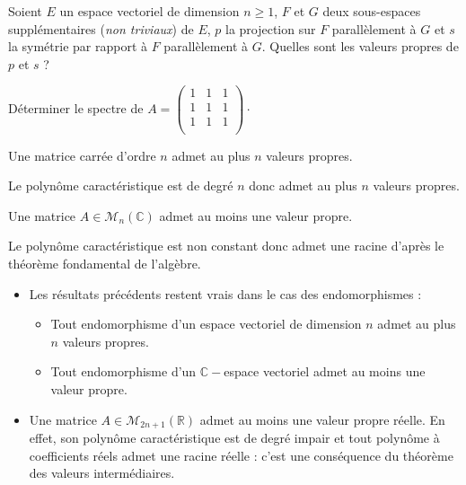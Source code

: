 \documentclass[french,11pt,twoside]{VcCours}
\begin{document}
\newpage
\begin{Exemple}{} Soient $E$ un espace vectoriel de dimension $n \geq 1$, $F$ et $G$ deux sous-espaces supplémentaires (\emph{non triviaux}) de $E$, $p$ la projection sur $F$ parallèlement à $G$ et $s$ la symétrie par rapport à $F$ parallèlement à $G$. Quelles sont les valeurs propres de $p$ et $s$ ?

\vspace*{4cm}
\end{Exemple} 

\begin{ApplicationDirecte}{} Déterminer le spectre de $A = \begin{pmatrix}
1 & 1 & 1 \\
1 & 1 & 1 \\
1 & 1 & 1 \\
\end{pmatrix}\cdot$
\end{ApplicationDirecte}

\begin{Corollaire}{} Une matrice carrée d'ordre $n$ admet au plus $n$ valeurs propres.
\end{Corollaire}

\begin{Demonstration}{} Le polynôme caractéristique est de degré $n$ donc admet au plus $n$ valeurs propres.
\end{Demonstration}

\begin{Corollaire}{} Une matrice $A \in \mathcal{M}_n(\mathbb{C})$ admet au moins une valeur propre.
\end{Corollaire}

\begin{Demonstration}{} Le polynôme caractéristique est non constant donc admet une racine d'après le théorème fondamental de l'algèbre.
\end{Demonstration}


\begin{Remarques}{}
\begin{itemize}
\item Les résultats précédents restent vrais dans le cas des endomorphismes : 
\begin{itemize}
\item Tout endomorphisme d'un espace vectoriel de dimension $n$ admet au plus $n$ valeurs propres.
\item Tout endomorphisme d'un $\mathbb{C}-$espace vectoriel admet au moins une valeur propre.
\end{itemize}
\item Une matrice $A \in \mathcal{M}_{2n+1}(\mathbb{R})$ admet au moins une valeur propre réelle. En effet, son polynôme caractéristique est de degré impair et tout polynôme à coefficients réels admet une racine réelle : c'est une conséquence du théorème des valeurs intermédiaires.
\end{itemize}
\end{Remarques}
\end{document}
